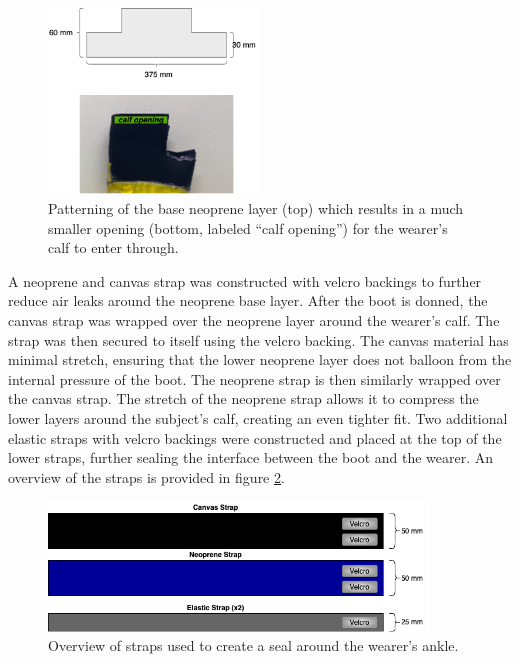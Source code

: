 \documentclass[defaultstyle,11pt]{thesis}
\begin{document}
\hypertarget{fig:SA4-baseseal}{%
\begin{figure}
\centering
\includegraphics[width=0.5\textwidth,height=\textheight]{../fig/SA4/BaseSeal.png}
\caption[{Neoprene layer patterning}]{Patterning of the base neoprene layer (top) which results in a much smaller opening (bottom, labeled ``calf opening'') for the wearer's calf to enter through.}
\label{fig:SA4-baseseal}
\end{figure}
}

A neoprene and canvas strap was constructed with velcro backings to further reduce air leaks around the neoprene base layer.
After the boot is donned, the canvas strap was wrapped over the neoprene layer around the wearer's calf.
The strap was then secured to itself using the velcro backing.
The canvas material has minimal stretch, ensuring that the lower neoprene layer does not balloon from the internal pressure of the boot.
The neoprene strap is then similarly wrapped over the canvas strap.
The stretch of the neoprene strap allows it to compress the lower layers around the subject's calf, creating an even tighter fit.
Two additional elastic straps with velcro backings were constructed and placed at the top of the lower straps, further sealing the interface between the boot and the wearer.
An overview of the straps is provided in figure \ref{fig:SA4-straps}.

\begin{figure}
\hypertarget{fig:SA4-straps}{%
\centering
\includegraphics[width=0.9\textwidth,height=\textheight]{../fig/SA4/Straps.png}
\caption{Overview of straps used to create a seal around the wearer's ankle.}\label{fig:SA4-straps}
}
\end{figure}
\end{document}
